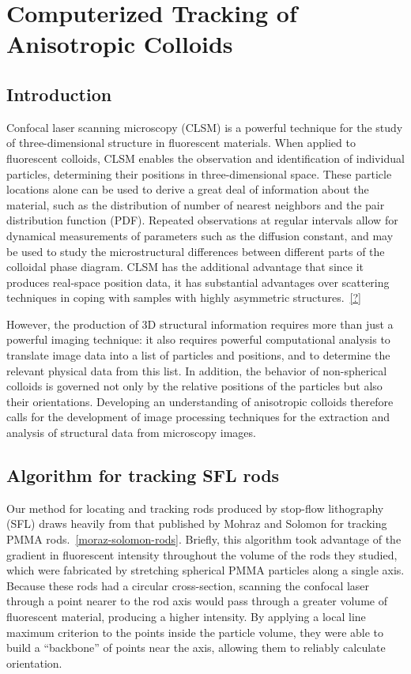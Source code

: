 \chapter{Computerized Tracking of Anisotropic Colloids}
\section{Introduction}

Confocal laser scanning microscopy (CLSM) is a powerful technique for the study of three-dimensional
structure in fluorescent materials. When applied to fluorescent colloids, CLSM enables the observation
and identification of individual particles, determining their positions in three-dimensional space.
These particle locations alone can be used to derive a great deal
of information about the material, such as the distribution of number of nearest neighbors and
the pair distribution function (PDF). Repeated observations at regular intervals allow for dynamical
measurements of parameters such as the diffusion constant, and may be used to study the microstructural
differences between different parts of the colloidal phase diagram. CLSM has the additional advantage
that since it produces real-space position data, it has substantial advantages over scattering techniques
in coping with samples with highly asymmetric structures.~\ref{?}

However, 
the production of 3D structural information requires more than just a powerful imaging technique: it also
requires powerful computational analysis to translate image data into a list of particles and positions, and
to determine the relevant physical data from this list.  In addition, the behavior of non-spherical colloids
is governed not only by the relative positions of the particles but also their orientations. Developing an
understanding of anisotropic colloids
therefore calls for the development of image processing techniques for the extraction and analysis of
structural data from microscopy images.

\section{Algorithm for tracking SFL rods}
\label{sec:rod-tracking}

Our method for locating and tracking rods produced by stop-flow lithography (SFL) draws heavily from that published by 
Mohraz and Solomon for tracking PMMA rods.~\ref{moraz-solomon-rods}.  Briefly, this algorithm 
took advantage of the gradient in fluorescent intensity throughout the volume of the 
rods they studied, which were fabricated by stretching spherical PMMA particles along a single axis.
Because these rods had a circular cross-section, scanning the confocal laser through a point nearer
to the rod axis would pass through a greater volume of fluorescent material, producing a higher intensity.
By applying a local line maximum criterion to the points inside the particle volume, they were able to 
build a ``backbone'' of points near the axis, allowing them to reliably calculate orientation.

